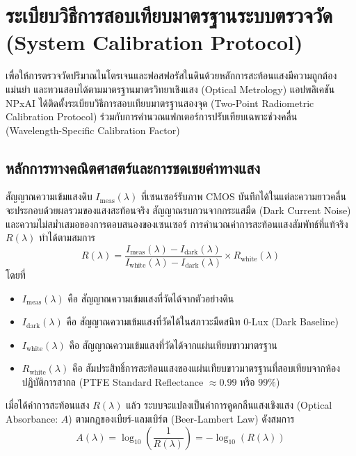\documentclass[12pt,a4paper,oneside]{book}
\begin{document}
\section{ระเบียบวิธีการสอบเทียบมาตรฐานระบบตรวจวัด (System Calibration Protocol)}
เพื่อให้การตรวจวัดปริมาณไนโตรเจนและฟอสฟอรัสในดินด้วยหลักการสะท้อนแสงมีความถูกต้อง แม่นยำ และทวนสอบได้ตามมาตรฐานมาตรวิทยาเชิงแสง (Optical Metrology) แอปพลิเคชัน NPxAI ได้ติดตั้งระเบียบวิธีการสอบเทียบมาตรฐานสองจุด (Two-Point Radiometric Calibration Protocol) ร่วมกับการคำนวณแฟกเตอร์การปรับเทียบเฉพาะช่วงคลื่น (Wavelength-Specific Calibration Factor)

\subsection{หลักการทางคณิตศาสตร์และการชดเชยค่าทางแสง}
สัญญาณความเข้มแสงดิบ $I_{\text{meas}}(\lambda)$ ที่เซนเซอร์รับภาพ CMOS บันทึกได้ในแต่ละความยาวคลื่น จะประกอบด้วยผลรวมของแสงสะท้อนจริง สัญญาณรบกวนจากกระแสมืด (Dark Current Noise) และความไม่สม่ำเสมอของการตอบสนองของเซนเซอร์ การคำนวณค่าการสะท้อนแสงสัมพัทธ์ที่แท้จริง $R(\lambda)$ ทำได้ตามสมการ
\begin{equation}
R(\lambda) = \frac{I_{\text{meas}}(\lambda) - I_{\text{dark}}(\lambda)}{I_{\text{white}}(\lambda) - I_{\text{dark}}(\lambda)} \times R_{\text{white}}(\lambda)
\end{equation}
โดยที่
\begin{itemize}
    \item $I_{\text{meas}}(\lambda)$ คือ สัญญาณความเข้มแสงที่วัดได้จากตัวอย่างดิน
    \item $I_{\text{dark}}(\lambda)$ คือ สัญญาณความเข้มแสงที่วัดได้ในสภาวะมืดสนิท 0-Lux (Dark Baseline)
    \item $I_{\text{white}}(\lambda)$ คือ สัญญาณความเข้มแสงที่วัดได้จากแผ่นเทียบขาวมาตรฐาน
    \item $R_{\text{white}}(\lambda)$ คือ สัมประสิทธิ์การสะท้อนแสงของแผ่นเทียบขาวมาตรฐานที่สอบเทียบจากห้องปฏิบัติการสากล (PTFE Standard Reflectance $\approx 0.99$ หรือ $99\%$)
\end{itemize}

เมื่อได้ค่าการสะท้อนแสง $R(\lambda)$ แล้ว ระบบจะแปลงเป็นค่าการดูดกลืนแสงเชิงแสง (Optical Absorbance: $A$) ตามกฎของเบียร์-แลมเบิร์ต (Beer-Lambert Law) ดังสมการ
\begin{equation}
A(\lambda) = \log_{10}\left(\frac{1}{R(\lambda)}\right) = -\log_{10}(R(\lambda))
\end{equation}
\end{document}
